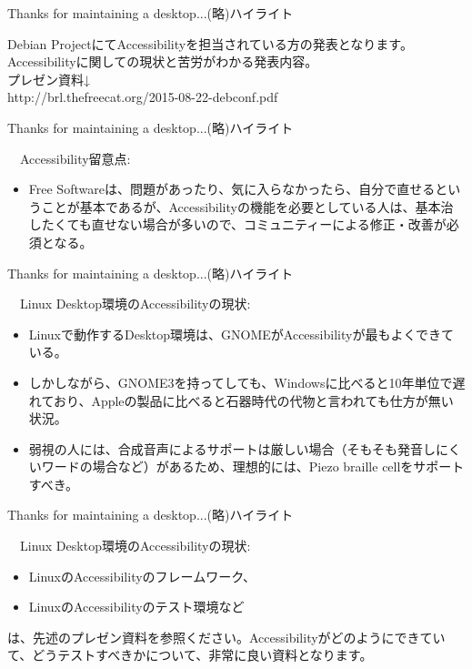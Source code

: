 \begin{frame}{{Thanks for maintaining a desktop...(略)ハイライト}}

  Debian ProjectにてAccessibilityを担当されている方の発表となります。
  Accessibilityに関しての現状と苦労がわかる発表内容。\\
  プレゼン資料↓\\
  http://brl.thefreecat.org/2015-08-22-debconf.pdf

\end{frame}

\begin{frame}{{Thanks for maintaining a desktop...(略)ハイライト}}

  　Accessibility留意点:
  \begin{itemize}
\item Free Softwareは、問題があったり、気に入らなかったら、自分で直せるということが基本であるが、Accessibilityの機能を必要としている人は、基本治したくても直せない場合が多いので、コミュニティーによる修正・改善が必須となる。
  \end{itemize}

\end{frame}

\begin{frame}{{Thanks for maintaining a desktop...(略)ハイライト}}

　Linux Desktop環境のAccessibilityの現状:
  \begin{itemize}
  \item Linuxで動作するDesktop環境は、GNOMEがAccessibilityが最もよくできている。
  \item しかしながら、GNOME3を持ってしても、Windowsに比べると10年単位で遅れており、Appleの製品に比べると石器時代の代物と言われても仕方が無い状況。
  \item 弱視の人には、合成音声によるサポートは厳しい場合（そもそも発音しにくいワードの場合など）があるため、理想的には、Piezo braille cellをサポートすべき。
  \end{itemize}

\end{frame}

\begin{frame}{{Thanks for maintaining a desktop...(略)ハイライト}}

　Linux Desktop環境のAccessibilityの現状:
  \begin{itemize}
  \item LinuxのAccessibilityのフレームワーク、
  \item LinuxのAccessibilityのテスト環境など
  \end{itemize}

  は、先述のプレゼン資料を参照ください。Accessibilityがどのようにできていて、どうテストすべきかについて、非常に良い資料となります。
  
\end{frame}

